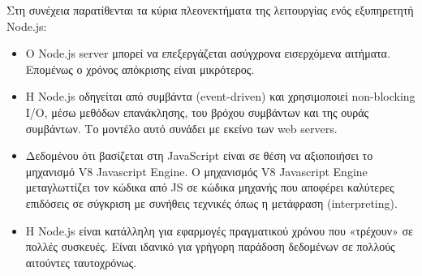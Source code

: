 Στη συνέχεια παρατίθενται τα κύρια πλεονεκτήματα της λειτουργίας ενός εξυπηρετητή Node.js:

\begin{itemize}
    \item Ο Node.js server μπορεί να επεξεργάζεται ασύγχρονα εισερχόμενα αιτήματα. Επομένως ο χρόνος απόκρισης είναι μικρότερος.
    \item Η Node.js οδηγείται από συμβάντα (event-driven) και χρησιμοποιεί non-blocking I/O, μέσω μεθόδων επανάκλησης, του βρόχου συμβάντων και της ουράς συμβάντων. Το μοντέλο αυτό συνάδει με εκείνο των web servers.
    \item Δεδομένου ότι βασίζεται στη JavaScript είναι σε θέση να αξιοποιήσει το μηχανισμό V8 Javascript Engine. Ο μηχανισμός V8 Javascript Engine μεταγλωττίζει τον κώδικα από JS σε κώδικα μηχανής που αποφέρει καλύτερες επιδόσεις σε σύγκριση με συνήθεις τεχνικές όπως η μετάφραση (interpreting).
    \item Η Node.js είναι κατάλληλη για εφαρμογές πραγματικού χρόνου που «τρέχουν» σε πολλές συσκευές. Είναι ιδανικό για γρήγορη παράδοση δεδομένων σε πολλούς αιτούντες ταυτοχρόνως.
\end{itemize}

